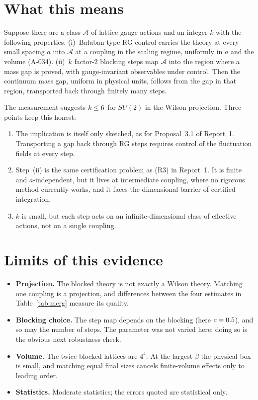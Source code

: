 \documentclass[11pt,a4paper]{article}
\newcommand{\idref}[1]{\textsf{#1}}
\begin{document}
\section{What this means}

\begin{proposal}[Finite core; recorded as \idref{A-047}, \statusbadge{OPEN}]
Suppose there are a class $\mathcal A$ of lattice gauge actions and an integer $k$ with the following properties. (i)~Ba{\l}aban-type RG control carries the theory at every small spacing $a$ into $\mathcal A$ at a coupling in the scaling regime, uniformly in $a$ and the volume (\idref{A-034}). (ii)~$k$ factor-2 blocking steps map $\mathcal A$ into the region where a mass gap is proved, with gauge-invariant observables under control. Then the continuum mass gap, uniform in physical units, follows from the gap in that region, transported back through finitely many steps.
\end{proposal}

The measurement suggests $k\le6$ for $SU(2)$ in the Wilson projection. Three points keep this honest:
\begin{enumerate}
\item The implication is itself only sketched, as for Proposal~3.1 of Report~1. Transporting a gap back through RG steps requires control of the fluctuation fields at every step.
\item Step~(ii) is the same certification problem as (R3) in Report~1. It is finite and $a$-independent, but it lives at intermediate coupling, where no rigorous method currently works, and it faces the dimensional barrier of certified integration.
\item $k$ is small, but each step acts on an infinite-dimensional class of effective actions, not on a single coupling.
\end{enumerate}

\section{Limits of this evidence}\label{sec:limits}
\begin{itemize}
\item \textbf{Projection.} The blocked theory is not exactly a Wilson theory. Matching one coupling is a projection, and differences between the four estimates in Table~\ref{tab:mcrg} measure its quality.
\item \textbf{Blocking choice.} The step map depends on the blocking (here $c=0.5$), and so may the number of steps. The parameter was not varied here; doing so is the obvious next robustness check.
\item \textbf{Volume.} The twice-blocked lattices are $4^4$. At the largest $\beta$ the physical box is small, and matching equal final sizes cancels finite-volume effects only to leading order.
\item \textbf{Statistics.} Moderate statistics; the errors quoted are statistical only.
\end{itemize}
\end{document}
